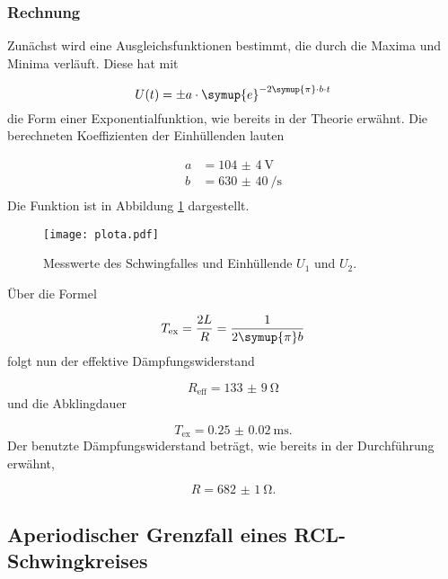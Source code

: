 \subsubsection{Rechnung}

Zunächst wird eine Ausgleichsfunktionen bestimmt, die durch die Maxima und
Minima verläuft.
Diese hat mit

\begin{equation}
  U(t) = \pm a \cdot \symup{e}^{-2\symup{\pi}\cdot b \cdot t}
\end{equation}
die Form einer Exponentialfunktion, wie bereits in der Theorie erwähnt.
Die berechneten Koeffizienten der Einhüllenden lauten

\begin{align}
  a & = \SI{104(4)}{\V} \\
  b & = \SI{630(40)}{\per\second} \\
\end{align}
Die Funktion ist in Abbildung \ref{fig:Schwingfall} dargestellt.

\begin{figure}[h]
  \centering
  \texttt{[image: plota.pdf]}
  \caption{Messwerte des Schwingfalles und Einhüllende $U_1$ und $U_2$.}
  \label{fig:Schwingfall}
\end{figure}

Über die Formel

\begin{equation}
  T_\text{ex} = \frac{2L}{R} = \frac{1}{2\symup{\pi}b}
\end{equation}
folgt nun der effektive Dämpfungswiderstand

\begin{equation}
  R_\text{eff} = \SI{133(9)}{\ohm}
\end{equation}
und die Abklingdauer

\begin{equation}
  T_\text{ex} = \SI{0.25(2)}{\milli\second} .
\end{equation}
Der benutzte Dämpfungswiderstand beträgt, wie bereits in der Durchführung
erwähnt,

\begin{equation}
  R = \SI{682(1)}{\ohm} .
\end{equation}


\subsection{Aperiodischer Grenzfall eines RCL-Schwingkreises}

